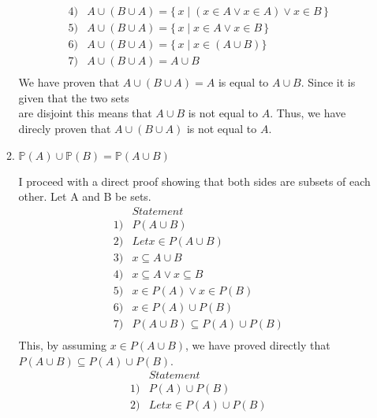 \documentclass[11pt]{article}
\begin{document}
\begin{justify}
\begin{enumerate}
\begin{enumerate}
\begin{mdframed}
\begin{align*}
        4) &A \cup (B \cup A) = \{\, x \mid (x \in A \lor x \in A) \lor x \in B\,\} \tag{4. commutative and associative law} \\
        5) &A \cup (B \cup A) = \{\, x \mid x \in A \lor x \in B \,\} \tag{5. idempotent law} \\
        6) &A \cup (B \cup A) = \{\, x \mid x \in (A \cup B)\} \tag{6. definition of set} \\
        7) &A \cup (B \cup A) = A \cup B \tag{7. definition of set and set builder} \\
    \end{align*}
    We have proven that $A \cup (B \cup A) = A$ is equal to $A \cup B$. Since it is given that the two sets \\ are disjoint
    this means that $A \cup B$ is not equal to $A$. Thus, we have direcly proven that $A \cup (B \cup A)$ is not equal to
    $A$. \\
\end{mdframed}
\item $\mathbb{P}(A) \cup \mathbb{P}(B)= \mathbb{P}(A \cup B)$
\begin{mdframed}
    I proceed with a direct proof showing that both sides are subsets of each other. Let A and B be sets.
    \begin{align*}
        &Statement \tag{Reason} \\
        1) &P(A \cup B) \tag{1. Given} \\
        2) &Let x \in P(A \cup B) \tag{2. def of arbitrary element} \\
        3) &x \subseteq A \cup B \tag{3. def of power set} \\
        4) &x \subseteq A \lor x \subseteq B \tag{4. def of union} \\
        5) &x \in P(A) \lor  x \in P(B) \tag{5. def of power set} \\
        6) &x \in P(A) \cup P(B) \tag{6. def of union} \\
        7) &P(A \cup B) \subseteq P(A) \cup P(B) \tag{7. def of subset} \\
    \end{align*}
    This, by assuming $x \in P(A \cup B)$, we have proved directly that $P(A \cup B) \subseteq P(A) \cup P(B)$.
    \begin{align*}
        &Statement \tag{Reason} \\
        1) &P(A) \cup P(B) \tag{1. Given} \\
        2) &Let x \in P(A) \cup P(B) \tag{2. def of arbitrary element} \\

\end{align*}
\end{mdframed}
\end{enumerate}
\end{enumerate}
\end{justify}
\end{document}
